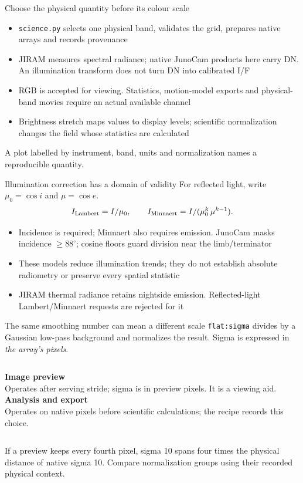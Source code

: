 \documentclass[aspectratio=169,11pt]{beamer}
\newcommand{\currevsec}{}
\newcommand{\revsec}[1]{\gdef\currevsec{#1}}
\begin{document}
\begin{frame}{Choose the physical quantity before its colour scale}
  \revsec{4.19}
\begin{itemize}
    \item \texttt{science.py} selects one physical band, validates the grid, prepares native arrays and records provenance
    \item JIRAM measures spectral radiance; native JunoCam products here carry DN. An illumination transform does not turn DN into calibrated I/F
    \item RGB is accepted for viewing. Statistics, motion-model exports and physical-band movies require an actual available channel
    \item Brightness stretch maps values to display levels; scientific normalization changes the field whose statistics are calculated
  \end{itemize}
  A plot labelled by instrument, band, units and normalization names a reproducible quantity.
\end{frame}

\begin{frame}{Illumination correction has a domain of validity}
  \revsec{4.18}
For reflected light, write $\mu_0=\cos i$ and $\mu=\cos e$.
  \[
    I_{\rm Lambert}=I/\mu_0, \qquad
    I_{\rm Minnaert}=I/(\mu_0^k\,\mu^{k-1}).
  \]
  \begin{itemize}
    \item Incidence is required; Minnaert also requires emission. JunoCam masks incidence $\geq88^\circ$; cosine floors guard division near the limb/terminator
    \item These models reduce illumination trends; they do not establish absolute radiometry or preserve every spatial statistic
    \item JIRAM thermal radiance retains nightside emission. Reflected-light Lambert/Minnaert requests are rejected for it
  \end{itemize}
\end{frame}

\begin{frame}{The same smoothing number can mean a different scale}
  \revsec{4.18}
\texttt{flat:sigma} divides by a Gaussian low-pass background and normalizes the result. Sigma is expressed in \emph{the array's pixels}.
  \vspace{0.3cm}
  \begin{columns}[T]
    \textbf{Image preview}\\
    \small Operates after serving stride; sigma is in preview pixels. It is a viewing aid.
    \textbf{Analysis and export}\\
    \small Operates on native pixels before scientific calculations; the recipe records this choice.
  \end{columns}
  \vspace{0.4cm}
  If a preview keeps every fourth pixel, sigma 10 spans four times the physical distance of native sigma 10. Compare normalization groups using their recorded physical context.
\end{frame}
\end{document}
